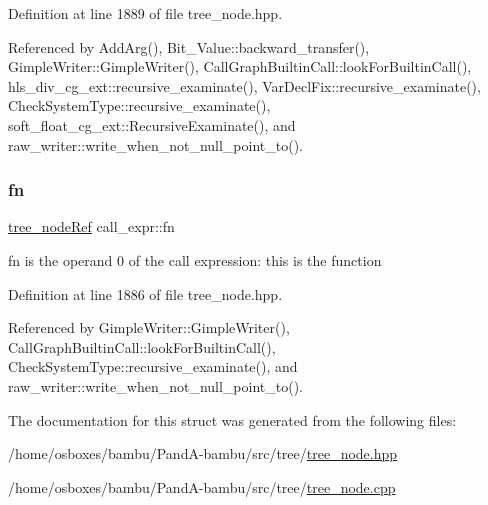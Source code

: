 Definition at line 1889 of file tree\+\_\+node.\+hpp.



Referenced by Add\+Arg(), Bit\+\_\+\+Value\+::backward\+\_\+transfer(), Gimple\+Writer\+::\+Gimple\+Writer(), Call\+Graph\+Builtin\+Call\+::look\+For\+Builtin\+Call(), hls\+\_\+div\+\_\+cg\+\_\+ext\+::recursive\+\_\+examinate(), Var\+Decl\+Fix\+::recursive\+\_\+examinate(), Check\+System\+Type\+::recursive\+\_\+examinate(), soft\+\_\+float\+\_\+cg\+\_\+ext\+::\+Recursive\+Examinate(), and raw\+\_\+writer\+::write\+\_\+when\+\_\+not\+\_\+null\+\_\+point\+\_\+to().

\mbox{\label{structcall__expr_a8c2caf3e2b9bb0cb22adc6e062b3f99f}} 
\subsubsection{\texorpdfstring{fn}{fn}}
{\footnotesize\ttfamily \hyperlink{tree__node_8hpp_a6ee377554d1c4871ad66a337eaa67fd5}{tree\+\_\+node\+Ref} call\+\_\+expr\+::fn}



fn is the operand 0 of the call expression\+: this is the function 



Definition at line 1886 of file tree\+\_\+node.\+hpp.



Referenced by Gimple\+Writer\+::\+Gimple\+Writer(), Call\+Graph\+Builtin\+Call\+::look\+For\+Builtin\+Call(), Check\+System\+Type\+::recursive\+\_\+examinate(), and raw\+\_\+writer\+::write\+\_\+when\+\_\+not\+\_\+null\+\_\+point\+\_\+to().



The documentation for this struct was generated from the following files\+:\begin{DoxyCompactItemize}
\item 
/home/osboxes/bambu/\+Pand\+A-\/bambu/src/tree/\hyperlink{tree__node_8hpp}{tree\+\_\+node.\+hpp}\item 
/home/osboxes/bambu/\+Pand\+A-\/bambu/src/tree/\hyperlink{tree__node_8cpp}{tree\+\_\+node.\+cpp}\end{DoxyCompactItemize}

